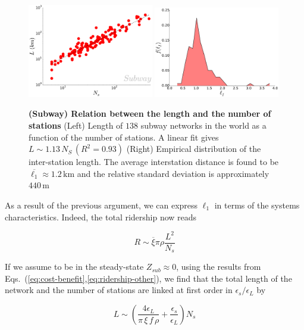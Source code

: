 \begin{figure} \centering
    \includegraphics[width=0.49\textwidth]{gfx/chapter-networks/metro_length_stations.pdf}
    \includegraphics[width=0.49\textwidth]{gfx/chapter-networks/metro_hist_ell_1.pdf}
    \caption{{\bf (Subway) Relation between the length and the number of
    stations} (Left) Length of $138$ subway networks in the world as a function
of the number of stations. A linear fit gives $L \sim 1.13\,N_S\,(R^2=0.93)$
(Right) Empirical distribution of the inter-station length. The average
interstation distance is found to be $\overline{\ell_1} \approx 1.2\, \text{km}$
and the relative standard deviation is approximately $440\,\text{m}$
\label{fig:metro_length_stations}}
\end{figure}

As a result of the previous argument, we can express $\ell_1$ in terms of the
systems characteristics. Indeed, the total ridership now reads

\begin{equation}
    R \sim \overline{\xi}\pi\rho\frac{L^2}{N_s}
    \label{eq:ridership-other}
\end{equation}

If we assume to be in the steady-state $Z_{sub} \approx 0$, using the results
from Eqs.~(\ref{eq:cost-benefit},\ref{eq:ridership-other}), we find that the
total length of the network and the number of stations are linked at first order
in $\epsilon_s/\epsilon_L$ by

\begin{equation}
    L \sim \left( \frac{4 \epsilon_L}{\pi\,\xi\,f\,\rho} + \frac{\epsilon_s}{\epsilon_L}\right) N_s
    \label{eq:length-stations}
\end{equation}

